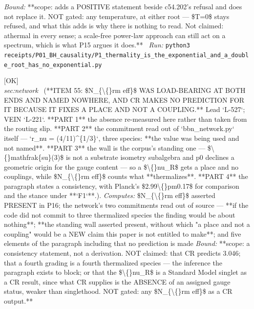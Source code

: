 \begin{description}
 \emph{Bound:} **scope: adds a POSITIVE statement beside c54.202's refusal and does not replace it. NOT gated: any temperature, at either root --- \$T=0\$ stays refused, and what this adds is why there is nothing to read. Not claimed: athermal in every sense; a scale-free power-law approach can still act on a spectrum, which is what P15 argues it does.**
\ \emph{Run:} \texttt{python3 receipts/P01\_BH\_causality/P1\_thermality\_is\_the\_exponential\_and\_a\_double\_root\_has\_no\_exponential.py}
\item[\label{rcpt:P16_CR_makes_no_Neff_prediction_because_it_fixes_a_place_and_not_a_coupling}\texttt{P16\_CR\_makes\_no\_Neff\_prediction\_because\_it\_fixes\_a\_place\_and\_not\_a\_coupling}]\hfill\textsf{[OK]}\\
\textit{sec:network} \ (**ITEM 55: \$N\_\{\textbackslash\{\}rm eff\}\$ WAS LOAD-BEARING AT BOTH ENDS AND NAMED NOWHERE, AND CR MAKES NO PREDICTION FOR IT BECAUSE IT FIXES A PLACE AND NOT A COUPLING.** Lead `L-527`; VEIN `L-221`. **PART 1** the absence re-measured here rather than taken from the routing slip. **PART 2** the commitment read out of `bbn\_network.py` itself --- `r\_nu = (4/11)\textasciicircum{}\{1/3\}`, three species: **the value was being used and not named**. **PART 3** the wall is the corpus's standing one --- \$\textbackslash\{\}mathfrak\{su\}(3)\$ is not a substrate isometry subalgebra and p0 declines a geometric origin for the gauge content --- so a \$\textbackslash\{\}nu\_R\$ gets a place and no couplings, while \$N\_\{\textbackslash\{\}rm eff\}\$ counts what **thermalizes**. **PART 4** the paragraph states a consistency, with Planck's \$2.99\textbackslash\{\}pm0.17\$ for comparison and the stance under **`F1`**.). 
\emph{Computes:} \$N\_\{\textbackslash\{\}rm eff\}\$ asserted PRESENT in P16; the network's two commitments read out of source --- **if the code did not commit to three thermalized species the finding would be about nothing**; **the standing wall asserted present, without which "a place and not a coupling" would be a NEW claim this paper is not entitled to make**; and five elements of the paragraph including that no prediction is made
 \emph{Bound:} **scope: a consistency statement, not a derivation. NOT claimed: that CR predicts 3.046; that a fourth grading is a fourth thermalized species --- the inference the paragraph exists to block; or that the \$\textbackslash\{\}nu\_R\$ is a Standard Model singlet as a CR result, since what CR supplies is the ABSENCE of an assigned gauge status, weaker than singlethood. NOT gated: any \$N\_\{\textbackslash\{\}rm eff\}\$ as a CR output.**

\end{description}

